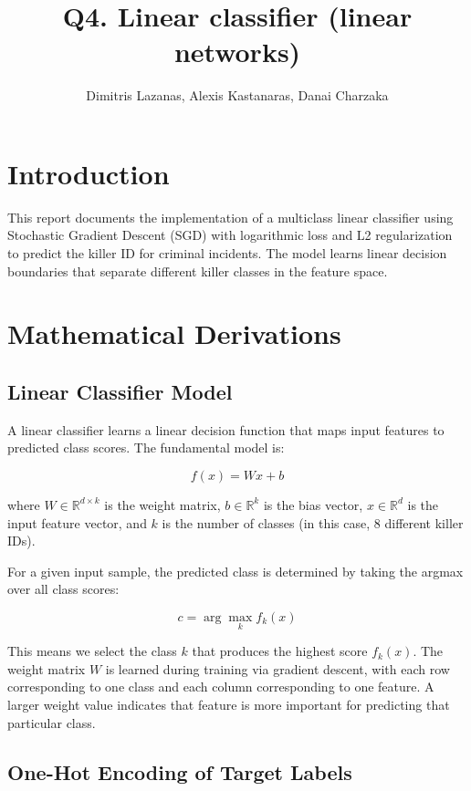 \documentclass[12pt]{article}
\title{Q4. Linear classifier (linear networks)}
\author{Dimitris Lazanas, Alexis Kastanaras, Danai Charzaka}
\begin{document}
\section{Introduction}

This report documents the implementation of a multiclass linear classifier using Stochastic Gradient Descent (SGD) with logarithmic loss and L2 regularization to predict the killer ID for criminal incidents. The model learns linear decision boundaries that separate different killer classes in the feature space.

\section{Mathematical Derivations}

\subsection{Linear Classifier Model}

A linear classifier learns a linear decision function that maps input features to predicted class scores. The fundamental model is:

\begin{equation}
f(x) = Wx + b
\end{equation}

where $W \in \mathbb{R}^{d \times k}$ is the weight matrix, $b \in \mathbb{R}^{k}$ is the bias vector, $x \in \mathbb{R}^{d}$ is the input feature vector, and $k$ is the number of classes (in this case, 8 different killer IDs).

For a given input sample, the predicted class is determined by taking the argmax over all class scores:

\begin{equation}
c = \arg\max_{k} f_k(x)
\end{equation}

This means we select the class $k$ that produces the highest score $f_k(x)$. The weight matrix $W$ is learned during training via gradient descent, with each row corresponding to one class and each column corresponding to one feature. A larger weight value indicates that feature is more important for predicting that particular class.

\subsection{One-Hot Encoding of Target Labels}
\end{document}
